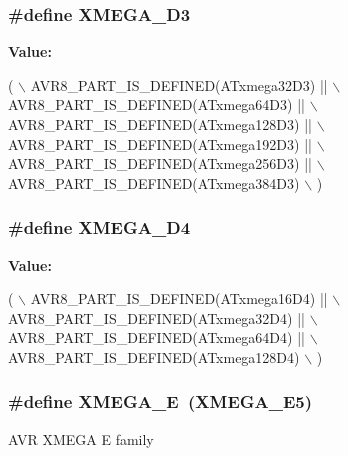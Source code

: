 \subsubsection[{X\+M\+E\+G\+A\+\_\+\+D3}]{\setlength{\rightskip}{0pt plus 5cm}\#define X\+M\+E\+G\+A\+\_\+\+D3}\label{group__xmega__part__macros__group_gad634208a506f79622c67be500014feb3}
{\bfseries Value\+:}
\begin{DoxyCode}
( \(\backslash\)
        AVR8\_PART\_IS\_DEFINED(ATxmega32D3)  || \(\backslash\)
        AVR8\_PART\_IS\_DEFINED(ATxmega64D3)  || \(\backslash\)
        AVR8\_PART\_IS\_DEFINED(ATxmega128D3) || \(\backslash\)
        AVR8\_PART\_IS\_DEFINED(ATxmega192D3) || \(\backslash\)
        AVR8\_PART\_IS\_DEFINED(ATxmega256D3) || \(\backslash\)
        AVR8\_PART\_IS\_DEFINED(ATxmega384D3) \(\backslash\)
        )
\end{DoxyCode}
\hypertarget{group__xmega__part__macros__group_ga831e633408c7458a445d333b9b3f142f}{}
\subsubsection[{X\+M\+E\+G\+A\+\_\+\+D4}]{\setlength{\rightskip}{0pt plus 5cm}\#define X\+M\+E\+G\+A\+\_\+\+D4}\label{group__xmega__part__macros__group_ga831e633408c7458a445d333b9b3f142f}
{\bfseries Value\+:}
\begin{DoxyCode}
( \(\backslash\)
        AVR8\_PART\_IS\_DEFINED(ATxmega16D4)  || \(\backslash\)
        AVR8\_PART\_IS\_DEFINED(ATxmega32D4)  || \(\backslash\)
        AVR8\_PART\_IS\_DEFINED(ATxmega64D4)  || \(\backslash\)
        AVR8\_PART\_IS\_DEFINED(ATxmega128D4) \(\backslash\)
        )
\end{DoxyCode}
\hypertarget{group__xmega__part__macros__group_gaab6d2543c5128fca0b1aeecb5c080723}{}
\subsubsection[{X\+M\+E\+G\+A\+\_\+\+E}]{\setlength{\rightskip}{0pt plus 5cm}\#define X\+M\+E\+G\+A\+\_\+\+E~(X\+M\+E\+G\+A\+\_\+\+E5)}\label{group__xmega__part__macros__group_gaab6d2543c5128fca0b1aeecb5c080723}
A\+V\+R X\+M\+E\+G\+A E family \hypertarget{group__xmega__part__macros__group_ga3bbcf2e955c9747a3595f8cdc01436ba}{}
